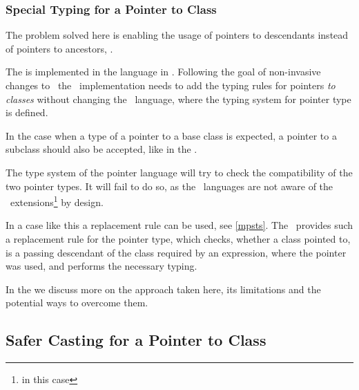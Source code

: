 \subsubsection{Special Typing for a Pointer to Class}
\label{pointertoclasstyping}

The problem solved here is enabling the usage of pointers to descendants instead of pointers to ancestors,
.


The   is implemented in the  language in \mbdr. 
Following the goal of non-invasive changes to \mbeddr\ the \pcpp\ implementation needs to add the 
typing rules for pointers \emph{to classes} without changing the    \mbdr\ language, where the 
typing system for pointer type is defined.

In the case when a type of a pointer to a base class is expected, a pointer to a subclass should also be accepted, like
in the .

The type system of the pointer language will try to check the compatibility of the two pointer types. It will
fail to do so, as the \mbdr\ languages are not aware of the \pcpp\ extensions\footnote{  in this case} 
by design.


In a case like this a replacement rule can be used, see \ref{mpsts}. The \pcpp\ provides such a replacement rule for the 
pointer type, which checks, whether a class pointed to, is a passing descendant of the class required by an expression, 
where the pointer was used, and performs the necessary typing.

In the  we discuss more on the approach taken here, its limitations and 
the potential ways to overcome them.

\subsection{Safer Casting for a Pointer to Class}
\label{safecasting}

\cppproblem

